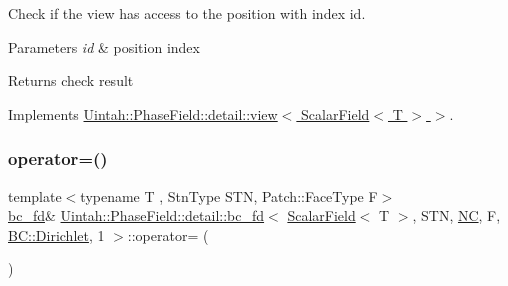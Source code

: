 Check if the view has access to the position with index id. 


\begin{DoxyParams}{Parameters}
{\em id} & position index \\
\hline
\end{DoxyParams}
\begin{DoxyReturn}{Returns}
check result 
\end{DoxyReturn}


Implements \hyperlink{classUintah_1_1PhaseField_1_1detail_1_1view_3_01ScalarField_3_01T_01_4_01_4_a9a950513dacd6468658436b737c3314f}{Uintah\+::\+Phase\+Field\+::detail\+::view$<$ Scalar\+Field$<$ T $>$ $>$}.

\mbox{\label{classUintah_1_1PhaseField_1_1detail_1_1bc__fd_3_01ScalarField_3_01T_01_4_00_01STN_00_01NC_00_01Fc8a6e28ffa258d282d0a921216b0ed9f_a63a8c64cac6bca8c276656b47c96f3ab}} 
\subsubsection{\texorpdfstring{operator=()}{operator=()}}
{\footnotesize\ttfamily template$<$typename T , Stn\+Type S\+TN, Patch\+::\+Face\+Type F$>$ \\
\hyperlink{classUintah_1_1PhaseField_1_1detail_1_1bc__fd}{bc\+\_\+fd}\& \hyperlink{classUintah_1_1PhaseField_1_1detail_1_1bc__fd}{Uintah\+::\+Phase\+Field\+::detail\+::bc\+\_\+fd}$<$ \hyperlink{structUintah_1_1PhaseField_1_1ScalarField}{Scalar\+Field}$<$ T $>$, S\+TN, \hyperlink{namespaceUintah_1_1PhaseField_a33d355affda78a83f45755ba8388cedda77924170fe82bfd58b74ca3e44139718}{NC}, F, \hyperlink{namespaceUintah_1_1PhaseField_a148fba372aa3be96fd6eede7a2fa10b5abac152b762896edff34ed668ae1a546f}{B\+C\+::\+Dirichlet}, 1 $>$\+::operator= (\begin{DoxyParamCaption}\item[{const \hyperlink{classUintah_1_1PhaseField_1_1detail_1_1bc__fd}{bc\+\_\+fd}$<$ \hyperlink{structUintah_1_1PhaseField_1_1ScalarField}{Scalar\+Field}$<$ T $>$, S\+TN, \hyperlink{namespaceUintah_1_1PhaseField_a33d355affda78a83f45755ba8388cedda77924170fe82bfd58b74ca3e44139718}{NC}, F, \hyperlink{namespaceUintah_1_1PhaseField_a148fba372aa3be96fd6eede7a2fa10b5abac152b762896edff34ed668ae1a546f}{B\+C\+::\+Dirichlet}, 1 $>$ \&}]{ }\end{DoxyParamCaption})\hspace{0.3cm}{\ttfamily [delete]}}



